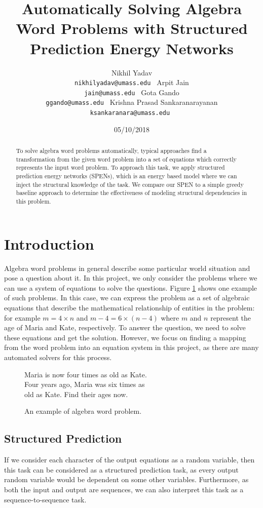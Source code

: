 \documentclass[11pt,letterpaper]{article}
\title{Automatically Solving Algebra Word Problems with Structured Prediction Energy Networks}
\author{Nikhil Yadav\\
  {\tt nikhilyadav@umass.edu } \And Arpit Jain\\ {\tt jain@umass.edu }  \And Gota Gando\\ {\tt ggando@umass.edu } \AND Krishna Prasad Sankaranarayanan\\ {\tt ksankaranara@umass.edu }}
\date{05/10/2018}
\begin{document}
\maketitle

\begin{abstract}
To solve algebra word problems automatically, typical approaches find a transformation from the given word problem into a set of equations which correctly represents the input word problem. To approach this task, we apply structured prediction energy networks (SPENs), which is an energy based model where we can inject the structural knowledge of the task. We compare our SPEN to a simple greedy baseline approach to determine the effectiveness of modeling structural dependencies in this problem.
\end{abstract}
\section{Introduction}
Algebra word problems in general describe some particular world situation and pose a question about it. In this project, we only consider the problems where we can use a system of equations to solve the questions. Figure \ref{algebra-example} shows one example of such problems. In this case, we can express the problem as a set of algebraic equations that describe the mathematical relationship of entities in the problem: for example $m = 4 \times n$ and $m-4 = 6 \times (n-4)$ where $m$ and $n$ represent the age of Maria and Kate, respectively. To answer the question, we need to solve these equations and get the solution. However, we focus on finding a mapping from the word problem into an equation system in this project, as there are many automated solvers for this process.
\begin{figure}[ht]
	\centering
	Maria is now four times as old as Kate.\\
Four years ago, Maria was six times as\\
old as Kate. Find their ages now.\\
	\caption{An example of algebra word problem.}
    \label{algebra-example}
\end{figure}
\subsection{Structured Prediction}
If we consider each character of the output equations as a random variable, then this task can be considered as a structured prediction task, as every output random variable would be dependent on some other variables. Furthermore, as both the input and output are sequences, we can also interpret this task as a sequence-to-sequence task.
\end{document}
